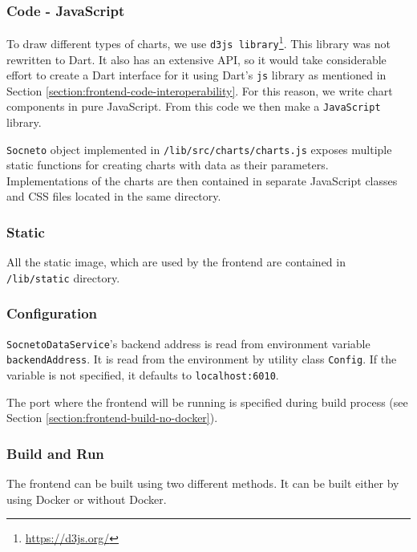 \subsubsection{Code - JavaScript}
To draw different types of charts, we use \texttt{d3js library}\footnote{\url{https://d3js.org/}}. This library was not rewritten to Dart. It also has an extensive API, so it would take considerable effort to create a Dart interface for it using Dart's \texttt{js} library as mentioned in Section \ref{section:frontend-code-interoperability}. For this reason, we  write chart components in pure JavaScript. From this code we then make a \texttt{JavaScript} library.

\texttt{Socneto} object implemented in \texttt{/lib/src/charts/charts.js} exposes multiple static functions for creating charts with data as their parameters. Implementations of the charts are then contained in separate JavaScript classes and CSS files located in the same directory.


\subsubsection{Static}
All the static image, which are used by the frontend are contained in \texttt{/lib/static} directory.

\subsubsection{Configuration}
\texttt{SocnetoDataService}'s backend address is read from environment variable \texttt{back\-endAddress}. It is read from the environment by utility class \texttt{Config}. If the variable is not specified, it defaults to \texttt{localhost:6010}.

The port where the frontend will be running is specified during build process (see Section \ref{section:frontend-build-no-docker}).

\subsubsection{Build and Run} \label{section:frontend-build}
The frontend can be built using two different methods. It can be built either by using Docker or without Docker.


